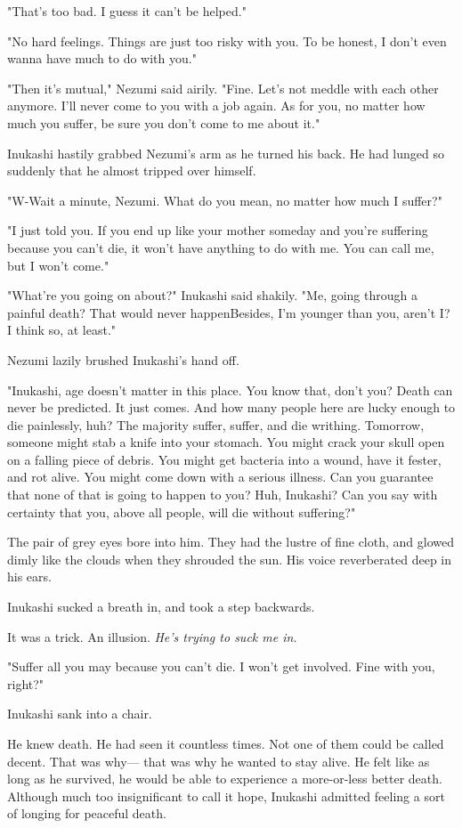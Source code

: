 "That's too bad. I guess it can't be helped."

"No hard feelings. Things are just too risky with you. To be honest, I
don't even wanna have much to do with you."

"Then it's mutual," Nezumi said airily. "Fine. Let's not meddle with
each other anymore. I'll never come to you with a job again. As for you,
no matter how much you suffer, be sure you don't come to me about it."

Inukashi hastily grabbed Nezumi's arm as he turned his back. He had
lunged so suddenly that he almost tripped over himself.

"W-Wait a minute, Nezumi. What do you mean, no matter how much I
suffer?"

"I just told you. If you end up like your mother someday and you're
suffering because you can't die, it won't have anything to do with me.
You can call me, but I won't come."

"What're you going on about\el ?" Inukashi said shakily. "Me, going
through a painful death? That would never happen\el Besides, I'm younger
than you, aren't I? I think so, at least."

Nezumi lazily brushed Inukashi's hand off.

"Inukashi, age doesn't matter in this place. You know that, don't you?
Death can never be predicted. It just comes. And how many people here
are lucky enough to die painlessly, huh? The majority suffer, suffer,
and die writhing. Tomorrow, someone might stab a knife into your
stomach. You might crack your skull open on a falling piece of debris.
You might get bacteria into a wound, have it fester, and rot alive. You
might come down with a serious illness. Can you guarantee that none of
that is going to happen to you? Huh, Inukashi? Can you say with
certainty that you, above all people, will die without suffering?"

The pair of grey eyes bore into him. They had the lustre of fine cloth,
and glowed dimly like the clouds when they shrouded the sun. His voice
reverberated deep in his ears.

Inukashi sucked a breath in, and took a step backwards.

It was a trick. An illusion. \emph{He's trying to suck me in.}

"Suffer all you may because you can't die. I won't get involved. Fine
with you, right?"

Inukashi sank into a chair.

He knew death. He had seen it countless times. Not one of them could be
called decent. That was why--- that was why he wanted to stay alive. He
felt like as long as he survived, he would be able to experience a
more-or-less better death. Although much too insignificant to call it
hope, Inukashi admitted feeling a sort of longing for peaceful death.

